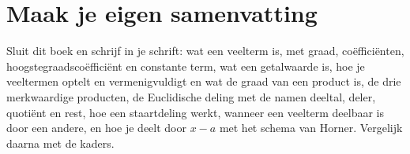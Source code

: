 
\ifzelfstudie
\section*{Maak je eigen samenvatting}
Sluit dit boek en schrijf in je schrift: wat een veelterm is, met graad, coëfficiënten, hoogstegraadscoëfficiënt en constante term, wat een getalwaarde is, hoe je veeltermen optelt en vermenigvuldigt en wat de graad van een product is, de drie merkwaardige producten, de Euclidische deling met de namen deeltal, deler, quotiënt en rest, hoe een staartdeling werkt, wanneer een veelterm deelbaar is door een andere, en hoe je deelt door $x - a$ met het schema van Horner. Vergelijk daarna met de kaders.
\fi
